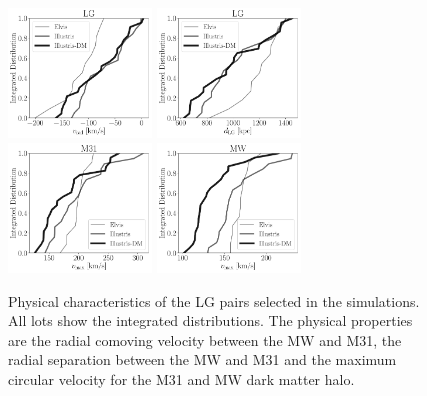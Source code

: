 \documentclass[a4paper,fleqn,usenatbib]{mnras}
\begin{document}
\begin{figure}
\centering
\includegraphics[width=0.34\textwidth]{int_distro_LG_v_rad.pdf}
\includegraphics[width=0.34\textwidth]{int_distro_LG_d.pdf}
\includegraphics[width=0.34\textwidth]{int_distro_M31_vmax.pdf}
\includegraphics[width=0.34\textwidth]{int_distro_MW_vmax.pdf}
\caption{Physical characteristics of the LG pairs selected in the
  simulations. All lots show the integrated distributions. The
  physical properties are the radial comoving velocity between the MW
  and M31, the radial separation between the MW and M31 and the
  maximum circular velocity for the M31 and MW dark matter halo.
\label{fig:physical}}
\end{figure}
\end{document}
